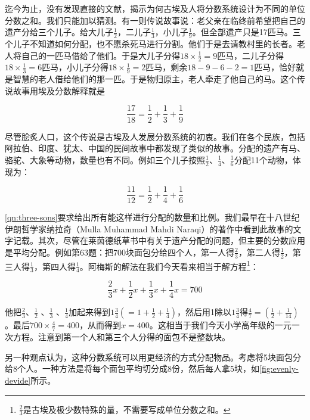 \documentclass[b5paper]{ctexart}
\begin{document}
迄今为止，没有发现直接的文献，揭示为何古埃及人将分数系统设计为不同的单位分数之和。我们只能加以猜测。有一则传说故事说：老父亲在临终前希望把自己的遗产分给三个儿子。给大儿子$\frac{1}{2}$，二儿子$\frac{1}{3}$，小儿子$\frac{1}{9}$。但全部遗产只是17匹马。三个儿子不知道如何分配，也不愿杀死马进行分割。他们于是去请教村里的长者。老人将自己的一匹马借给了他们。于是大儿子分得$18 \times \frac{1}{2} = 9$匹马，二儿子分得$18 \times \frac{1}{3} = 6$匹马，小儿子分得$18 \times \frac{1}{9} = 2$匹马，剩余$18 - 9 - 6 - 2 = 1$匹马，恰好就是智慧的老人借给他们的那一匹。于是物归原主，老人牵走了他自己的马。这个传说故事用埃及分数解释就是

\[
\frac{17}{18} = \frac{1}{2} + \frac{1}{3} + \frac{1}{9}
\]

尽管脍炙人口，这个传说是古埃及人发展分数系统的初衷。我们在各个民族，包括阿拉伯、印度、犹太、中国的民间故事中都发现了类似的故事。分配的遗产有马、骆驼、大象等动物，数量也有不同。例如三个儿子按照$\frac{1}{2}$、$\frac{1}{4}$、$\frac{1}{6}$分配11个动物，体现为：

\[
\frac{11}{12} = \frac{1}{2} + \frac{1}{4} + \frac{1}{6}
\]

\cref{qn:three-sons}要求给出所有能这样进行分配的数量和比例。我们最早在十八世纪伊朗哲学家纳拉奇（Mulla Muhammad Mahdi Naraqi）的著作中看到此故事的文字记载。其次，尽管在莱茵德纸草书中有关于遗产分配的问题，但主要的分数应用是平均分配。例如第63题：把700块面包分给四个人，第一人得$\frac{2}{3}$，第二人得$\frac{1}{2}$，第三人得$\frac{1}{3}$，第四人得$\frac{1}{4}$。阿梅斯的解法在我们今天看来相当于解方程\footnote{$\frac{2}{3}$是古埃及极少数特殊的量，不需要写成单位分数之和。}：

\[
\frac{2}{3}x + \frac{1}{2}x + \frac{1}{3}x + \frac{1}{4}x = 700
\]

他把$\frac{2}{3}$、$\frac{1}{2}$ 、$\frac{1}{3}$ 、$\frac{1}{4}$加起来得到$1\frac{3}{4} (= 1 + \frac{1}{2} + \frac{1}{4})$，然后用1除以$1\frac{3}{4}$得$\frac{4}{7} = (\frac{1}{2} + \frac{1}{14})$。最后$700 \times \frac{4}{7} = 400$，从而得到$x = 400$。这相当于我们今天小学高年级的一元一次方程。注意到第一个人和第三个人分得的面包不是整数块。

另一种观点认为，这种分数系统可以用更经济的方式分配物品。考虑将5块面包分给8个人。一种方法是将每个面包平均切分成8份，然后每人拿5块，如\cref{fig:evenly-devide}所示。
\end{document}
